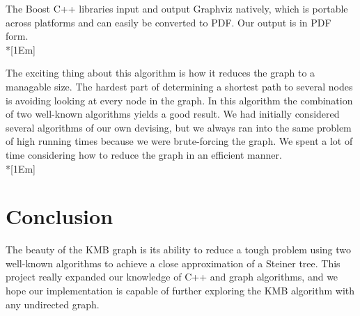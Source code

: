 \documentclass[12pt]{article}
\begin{document}
\begin{raggedright}
The Boost C++ libraries input and output Graphviz natively, which is portable 
across platforms and can easily be converted to PDF. Our output is in PDF form.\\*[1Em]

The exciting thing about this algorithm is how it reduces the graph to a managable
size. The hardest part of determining a shortest path to several nodes is avoiding
looking at every node in the graph. In this algorithm the combination of two well-known 
algorithms yields a good result. We had initially considered several 
algorithms of our own devising, but we always ran into the same problem of high
running times because we were brute-forcing the graph. We spent a lot of time
considering how to reduce the graph in an efficient manner.\\*[1Em]

\section*{Conclusion}
The beauty of the KMB graph is its ability to reduce a tough problem using two
well-known algorithms to achieve a close approximation of a Steiner tree. This 
project really expanded our knowledge of C++ and graph algorithms, and we hope our
implementation is capable of further exploring the KMB algorithm with any undirected
graph.

\end{raggedright}
\nocite{ks:pzh}


\end{document}
